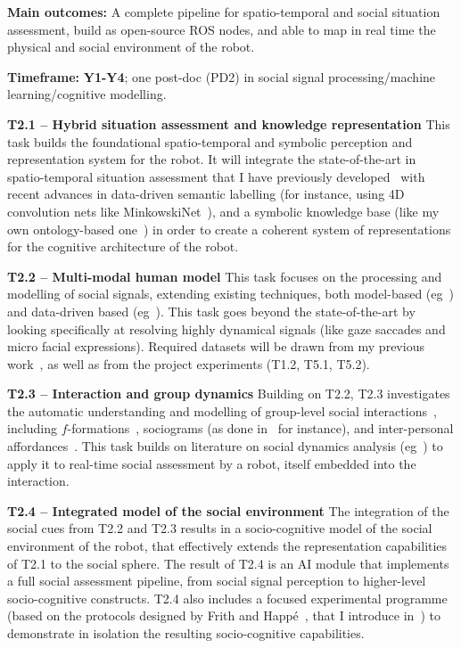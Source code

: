 \begin{framed}
    \textbf{Main outcomes:} A complete pipeline for spatio-temporal and social
    situation assessment, build as open-source ROS nodes, and able to map in
    real time the physical and social environment of the robot.

    \textbf{Timeframe:} \textbf{Y1-Y4}; one post-doc (PD2) in social
signal processing/machine learning/cognitive modelling.
\end{framed}

\textbf{T2.1 -- Hybrid situation assessment and knowledge representation} This
task builds the foundational spatio-temporal and symbolic perception and
representation system for the robot. It will integrate the state-of-the-art in
spatio-temporal situation assessment that I have previously
developed~\cite{lemaignan2018underworlds, sallami2019simulation} with recent
advances in data-driven semantic labelling (for instance, using 4D convolution
nets like MinkowskiNet~\cite{choy20194d}), and a symbolic knowledge base (like
my own ontology-based one~\cite{lemaignan2010oro}) in order to create a coherent
system of representations for the cognitive architecture of the robot.

\textbf{T2.2 -- Multi-modal human model} This task focuses on the processing and
modelling of social signals, extending existing techniques, both model-based
(eg~\cite{gunes2017automatic,lemaignan2016realtime}) and data-driven based
(eg~\cite{bartlett2019what}). This task goes beyond the state-of-the-art by
looking specifically at resolving highly dynamical signals (like gaze saccades
and micro facial expressions). Required datasets will be drawn from my previous
work~\cite{lemaignan2018pinsoro}, as well as from the project experiments (T1.2,
T5.1, T5.2).

\textbf{T2.3 -- Interaction and group dynamics} Building on T2.2, T2.3
investigates the automatic understanding and modelling of group-level social
interactions~\cite{tapus2019perceiving}, including
$f$-formations~\cite{marshall2011using}, sociograms (as done
in~\cite{garcia2016hybrid} for instance), and inter-personal
affordances~\cite{pandey2013affordance}. This task builds on literature on 
social dynamics analysis (eg~\cite{durantin2017social,jermann2009physical,
martinez2019collocated}) to apply it to real-time social assessment by a robot,
itself embedded into the interaction.

\textbf{T2.4 -- Integrated model of the social environment} The integration of
the social cues from T2.2 and T2.3 results in a socio-cognitive model of the
social environment of the robot, that effectively extends the representation
capabilities of T2.1 to the social sphere. The result of T2.4 is an AI module
that implements a full social assessment pipeline, from social signal perception
to higher-level socio-cognitive constructs. T2.4 also includes a
focused experimental programme (based on the protocols designed by Frith and
Happé~\cite{frith1994autism}, that I introduce in~\cite{lemaignan2015mutual}) to
demonstrate in isolation the resulting socio-cognitive capabilities.


